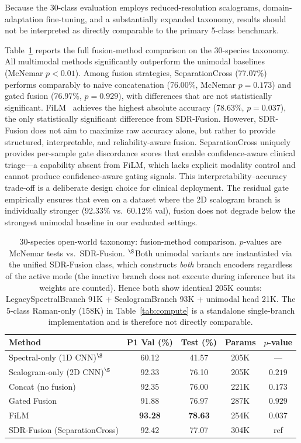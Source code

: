 \documentclass[preprint,12pt]{elsarticle}
\begin{document}
Because the 30-class evaluation employs reduced-resolution
scalograms, domain-adaptation fine-tuning, and a substantially
expanded taxonomy, results should not be interpreted as directly
comparable to the primary 5-class benchmark.

Table~\ref{tab:openworld} reports the full fusion-method comparison on
the 30-species taxonomy. All multimodal methods
significantly outperform the unimodal baselines (McNemar $p{<}0.01$).
Among fusion strategies, SeparationCross (77.07\%) performs
comparably to naive concatenation (76.00\%, McNemar $p{=}0.173$) and
gated fusion (76.97\%, $p{=}0.929$), with differences that are not
statistically significant. FiLM~\cite{perez2018film} achieves the
highest absolute accuracy (78.63\%, $p{=}0.037$), the only
statistically significant difference from SDR-Fusion. However, SDR-Fusion
does not aim to maximize raw accuracy alone, but rather to provide
structured, interpretable, and reliability-aware fusion. SeparationCross
uniquely provides per-sample gate discordance scores that enable
confidence-aware clinical triage---a capability absent from FiLM,
which lacks explicit modality control and cannot produce
confidence-aware gating signals. This interpretability--accuracy
trade-off is a deliberate design choice for clinical deployment. The
residual gate empirically ensures that even on a dataset where the 2D
scalogram branch is individually stronger (92.33\% vs.\ 60.12\% val),
fusion does not degrade below the strongest unimodal baseline in our
evaluated settings.

\begin{table}[!t]
\centering
\caption{30-species open-world taxonomy: fusion-method comparison.
$p$-values are McNemar tests vs.\ SDR-Fusion.
$^\S$Both unimodal variants are instantiated via the unified SDR-Fusion
class, which constructs \emph{both} branch encoders regardless of the
active mode (the inactive branch does not execute during inference but
its weights are counted). Hence both show identical 205K counts:
LegacySpectralBranch 91K + ScalogramBranch 93K + unimodal head 21K.
The 5-class Raman-only (158K) in Table~\ref{tab:compute} is a
standalone single-branch implementation and is therefore not directly
comparable.}
\label{tab:openworld}
\begin{tabular}{lcccc}
  \toprule
  Method & P1 Val (\%) & Test (\%) & Params & $p$-value \\
  \midrule
  Spectral-only (1D CNN)$^\S$  & 60.12 & 41.57 & 205K & --- \\
  Scalogram-only (2D CNN)$^\S$ & 92.33 & 76.10 & 205K & $0.219$ \\
  \midrule
  Concat (no fusion)         & 92.35 & 76.00 & 221K & $0.173$ \\
  Gated Fusion               & 91.88 & 76.97 & 287K & $0.929$ \\
  FiLM~\cite{perez2018film}  & \textbf{93.28} & \textbf{78.63} & 254K & $0.037$ \\
  SDR-Fusion (SeparationCross) & 92.42 & 77.07 & 304K & ref \\
  \bottomrule
\end{tabular}
\end{table}
\end{document}
